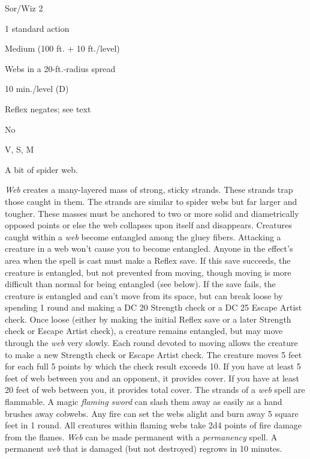 
\begin{description*}
\item[Level:] Sor/Wiz 2
\item[Casting Time:] 1 standard action
\item[Range:] Medium (100 ft. + 10 ft./level)
\item[Effect:] Webs in a 20-ft.-radius spread
\item[Duration:] 10 min./level (D)
\item[Saving Throw:] Reflex negates; see text
\item[Spell Resistance:] No
\item[Components:] V, S, M
\item[Arcane Material Component:] A bit of spider web.
\end{description*}

\textit{Web} creates a many-layered mass of strong, sticky strands. These strands
trap those caught in them. The strands are similar to spider webs but far larger
and tougher. These masses must be anchored to two or more solid and diametrically
opposed points or else the web collapses upon itself and disappears. Creatures
caught within a \textit{web} become entangled among the gluey fibers. Attacking
a creature in a web won't cause you to become entangled.
Anyone in the effect's area when the spell is cast must make a Reflex save. If
this save succeeds, the creature is entangled, but not prevented from moving, though
moving is more difficult than normal for being entangled (see below). If the save
fails, the creature is entangled and can't move from its space, but can break loose
by spending 1 round and making a DC 20 Strength check or a DC 25 Escape Artist
check. Once loose (either by making the initial Reflex save or a later Strength
check or Escape Artist check), a creature remains entangled, but may move through
the \textit{web} very slowly. Each round devoted to moving allows the creature
to make a new Strength check or Escape Artist check. The creature moves 5 feet
for each full 5 points by which the check result exceeds 10.
If you have at least 5 feet of web between you and an opponent, it provides cover.
If you have at least 20 feet of web between you, it provides total cover.
The strands of a \textit{web} spell are flammable. A magic \textit{flaming sword
}can slash them away as easily as a hand brushes away cobwebs. Any fire can set
the webs alight and burn away 5 square feet in 1 round. All creatures within flaming
webs take 2d4 points of fire damage from the flames.
\textit{Web} can be made permanent with a \textit{permanency} spell. A permanent
\textit{web} that is damaged (but not destroyed) regrows in 10 minutes.